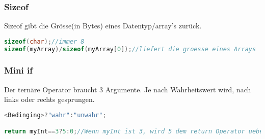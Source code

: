\subsubsection{Sizeof}

Sizeof gibt die Grösse(in Bytes) eines Datentyp/array's zurück.

\begin{lstlisting}[language = c]
sizeof(char);//immer 8
sizeof(myArray)/sizeof(myArray[0]);//liefert die groesse eines Arrays
\end{lstlisting}

\subsubsection{Mini if}

Der ternäre Operator braucht 3 Argumente. Je nach Wahrheitswert wird, nach links oder rechts gesprungen.
\begin{lstlisting}[language = c]
<Bedinging>?"wahr":"unwahr";

return myInt==3?5:0;//Wenn myInt ist 3, wird 5 dem return Operator uebergeben. Ansonsten wird 0 uebergeben
\end{lstlisting}

